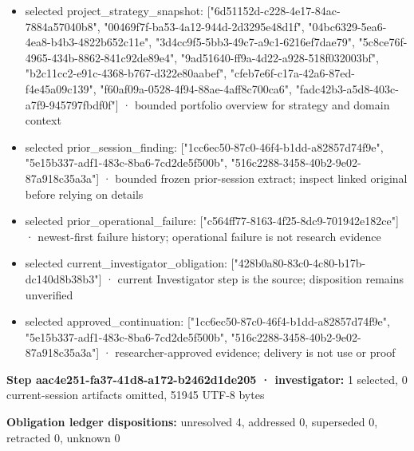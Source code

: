 \documentclass[11pt]{article}
\begin{document}
\begin{itemize}
\item selected project\_strategy\_snapshot: ["6d51152d-c228-4e17-84ac-7884a57040b8", "00469f7f-ba53-4a12-944d-2d3295e48d1f", "04bc6329-5ea6-4ea8-b4b3-4822b652c11e", "3d4cc9f5-5bb3-49c7-a9c1-6216ef7dae79", "5c8ce76f-4965-434b-8862-841c92de89e4", "9ad51640-ff9a-4d22-a928-518f032003bf", "b2c11cc2-e91c-4368-b767-d322e80aabef", "cfeb7e6f-c17a-42a6-87ed-f4e45a09c139", "f60af09a-0528-4f94-88ae-4aff8c700ca6", "fadc42b3-a5d8-403c-a7f9-945797fbdf0f"] · bounded portfolio overview for strategy and domain context
\item selected prior\_session\_finding: ["1cc6ec50-87c0-46f4-b1dd-a82857d74f9e", "5e15b337-adf1-483c-8ba6-7cd2de5f500b", "516c2288-3458-40b2-9e02-87a918c35a3a"] · bounded frozen prior-session extract; inspect linked original before relying on details
\item selected prior\_operational\_failure: ["c564ff77-8163-4f25-8dc9-701942e182ce"] · newest-first failure history; operational failure is not research evidence
\item selected current\_investigator\_obligation: ["428b0a80-83c0-4c80-b17b-dc140d8b38b3"] · current Investigator step is the source; disposition remains unverified
\item selected approved\_continuation: ["1cc6ec50-87c0-46f4-b1dd-a82857d74f9e", "5e15b337-adf1-483c-8ba6-7cd2de5f500b", "516c2288-3458-40b2-9e02-87a918c35a3a"] · researcher-approved evidence; delivery is not use or proof
\end{itemize}
\textbf{Step aac4e251-fa37-41d8-a172-b2462d1de205 · investigator:} 1 selected, 0 current-session artifacts omitted, 51945 UTF-8 bytes\par
\textbf{Obligation ledger dispositions:} unresolved 4, addressed 0, superseded 0, retracted 0, unknown 0\par
\end{document}

